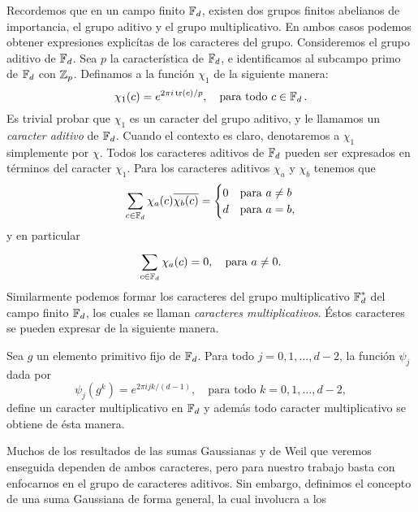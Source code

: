 Recordemos que en un campo finito $\operatorname{\mathbb{F}}_d$, existen dos grupos
finitos abelianos de importancia, el grupo aditivo y el
grupo multiplicativo. En ambos casos podemos obtener
expresiones explicítas de los caracteres del grupo.
Consideremos el grupo aditivo de $\operatorname{\mathbb{F}}_d$. Sea $p$ la
característica de $\operatorname{\mathbb{F}}_d$, e identificamos al subcampo primo
de $\operatorname{\mathbb{F}}_d$ con $\operatorname{\mathbb{Z}}_p$. Definamos a la función $\chi_1$ de la
siguiente manera:
\begin{equation}
  \chi_1(c)
  = e^{2\pi i \operatorname{tr}(c) / p},
  \quad
  \text{para todo } c \in \operatorname{\mathbb{F}}_d.
\end{equation}
Es trivial probar que $\chi_1$ es un caracter del grupo
aditivo, y le llamamos un \textit{caracter aditivo} de
$\operatorname{\mathbb{F}}_d$. Cuando el contexto es claro, denotaremos a $\chi_1$
simplemente por $\chi$. Todos los caracteres aditivos de
$\operatorname{\mathbb{F}}_d$ pueden ser expresados en términos del caracter
$\chi_1$. Para los caracteres aditivos $\chi_a$ y $\chi_b$
tenemos que
\begin{equation}
  \sum_{c \in \operatorname{\mathbb{F}}_d}^{}
  \chi_a(c) \overline{\chi_b(c)}
  = \begin{cases}
    0 & \text{para } a \neq b \\
    d & \text{para } a = b,
  \end{cases}
\end{equation}
y en particular
\begin{equation}
  \sum_{c \in \operatorname{\mathbb{F}}_d}^{} \chi_a(c) = 0,
  \quad
  \text{para } a \neq 0.
\end{equation}
Similarmente podemos formar los caracteres del grupo
multiplicativo $\operatorname{\mathbb{F}}_d^{*}$ del campo finito $\operatorname{\mathbb{F}}_d$, los
cuales se llaman \textit{caracteres multiplicativos}. Éstos
caracteres se pueden expresar de la siguiente manera.
\begin{theorem}
  Sea $g$ un elemento primitivo fijo de $\operatorname{\mathbb{F}}_d$. Para todo $j
  = 0,1,\ldots,d-2$, la función $\psi_j$ dada por
  \begin{equation}
    \psi_j(g^{k})
    = e^{2\pi i j k / (d-1)},
    \quad
    \text{para todo } k = 0,1,\ldots,d-2,
  \end{equation}
  define un caracter multiplicativo en $\operatorname{\mathbb{F}}_d$ y además todo
  caracter multiplicativo se obtiene de ésta manera.
\end{theorem}
Muchos de los resultados de las sumas Gaussianas y de Weil
que veremos enseguida dependen de ambos caracteres, pero
para nuestro trabajo basta con enfocarnos en el grupo de
caracteres aditivos. Sin embargo, definimos el concepto de
una suma Gaussiana de forma general, la cual involucra a los
